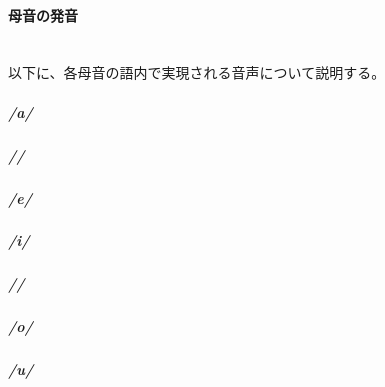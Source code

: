 \paragraph{母音の発音}\quad\\
以下に、各母音の語内で実現される音声について説明する。

\subparagraph{/a/}
\subparagraph{//}
\subparagraph{/e/}
\subparagraph{/i/}
\subparagraph{//}
\subparagraph{/o/}
\subparagraph{/u/}
